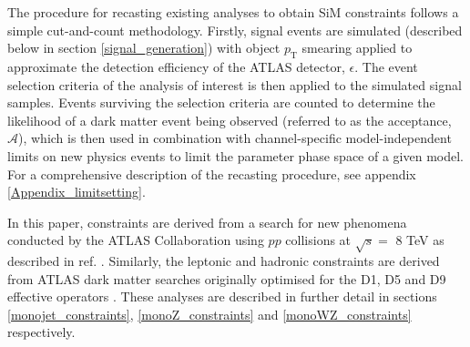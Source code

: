 The procedure for recasting existing \monoX analyses to obtain SiM constraints follows a simple cut-and-count methodology. Firstly, signal events are simulated (described below in section \ref{signal_generation}) with object $p_{\mathrm{T}}$ smearing applied to approximate the detection efficiency of the ATLAS detector, $\epsilon$. The event selection criteria of the \monoX analysis of interest is then applied to the simulated signal samples. Events surviving the selection criteria are counted to determine the likelihood of a dark matter event being observed (referred to as the acceptance, $\mathcal{A}$), which is then used in combination with channel-specific model-independent limits on new physics events to limit the parameter phase space of a given model.
For a comprehensive description of the recasting procedure, see appendix \ref{Appendix_limitsetting}.

In this paper, \monojet constraints are derived from a search for new phenomena conducted by the ATLAS Collaboration using $pp$ collisions at $\sqrt{s}=$ 8 TeV as described in ref. \cite{Aad:2015zva}. Similarly, the leptonic \monoZ and hadronic \monoWZ constraints are derived from ATLAS dark matter searches originally optimised for the D1, D5 and D9 effective operators \cite{Aad:2014monoZlep,Aad:2013monoWZ}. These analyses are described in further detail in sections \ref{monojet_constraints}, \ref{monoZ_constraints} and \ref{monoWZ_constraints} respectively.


